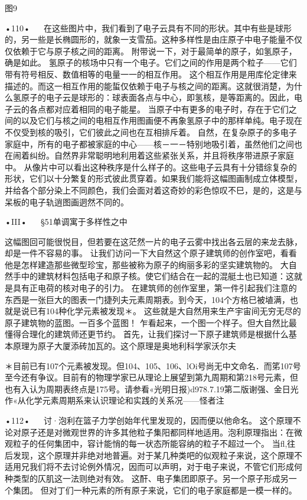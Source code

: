  

图9

•110•
  
在这些图片中，我们看到了电子云具有不同的形状。其中有些是球形的，另一些是长椭圆形的，就象一支雪茄。这种多样性是由庄原子中电子能量不仅仅依赖于它与原子核之间的距离。
附带说一下，对于最简单的原子，如氢原子，确是如此。
氢原子的核场中只有一个电子。它们之间的作用是两个粒子——它们带有符号相反、数值相等的电量一一的相互作用。
这个相互作用是用库伦定律来描述的。而这一相互作用的能蜇仅依赖于电子与核之间的距离。这就很消楚，为什么氢原子的电子云是球形的：球表面各点与中心，即氢核，是等距离的。因此，电子云的各点都对应着相同的电子能星。
当原子中有更多的电子时，存在于它们之间的以及它们与核之间的电相互作用图画便不再象氢原子中的那样单纯。电子现在不仅受到核的吸引，它们彼此之间也在互相排斥着。
自然，在复杂原子的多电子家庭中，所有的电子都被家庭的中心——核－一－特别地吸引着，虽然他们之间也在闹着纠纷。自然界非常聪明地利用着这些紧张关系，并且将秩序带进原子家庭中。
从像片中可以看出这种秩序是什么样子的。这些电子云具有十分错综复杂的形状，它们以十分繁复的形式彼此贯穿着。如果我们能将这幅图画制成立体模型，并给各个部分染上不同颜色，我们会面对着这奇妙的彩色惊叹不巳，是的，这是与呆板的电子轨逍图画迵然不同的。

•III•
  
§51单调寓于多样性之中

这幅图回可能很悦目，但若要在这茫然一片的电子云雾中找出各云层的来龙去脉，却是一件不容易的事。
让我们访问一下大自然这个原子建筑师的创作室吧，看看他是怎样建造那些微型珍宝，那些被称为原子的绚丽多彩的坚实建筑物的。
大自然手中的建筑材料包括电子和原子核。使它们结合在一起的混艇土也已知道：这就是具有正电荷的核对电子的引力。
在建筑师的创作室里，第一件引起我们注意的东西是一张巨大的图表一门捷列夫元素周期表。到今天，104个方格巳被埴满，也就是说已有104种化学元素被发现＊。
这些就是大自然用来生产宇宙间无穷无尽的原子建筑物的蓝图。一百多个蓝图！
乍看起来，一个图一个样子。但大自然比最懂得合理化的建筑师还更节约。
首先，让我们探讨一下原子建筑师是根据什么基本原理为原子大厦添砖加瓦的。这个原理是奥地利科学家沃尔夫

＊目前已有107个元素被发现。但104、105、106、lOi号尚无中文命名．而笫107号至今还有争议。目前有的物理学家已从理论上展望到第九周期和第218号元素，但也有入认为周期表终点是175号。请参看«光明日报)d978.7.19第二版谢强、金日光作«从化学元素周期系来认识理论和实践的关系况——怪者注

•112•
  
讨·泡利在篮子力学创始年代里发现的，因而便以他命名。
这个原理不论对原子还是对微观世界的许多其他粒子集阳都同样地适用。泡利原理指出：在微观粒子的任何集团中，容计能悄的每一状态所能容纳的粒子不超过一个。
当fl,往后发现，这个原理并非绝对地普遍。对于某几种类吧的似观粒子来说，这个原理不适用兄我们将不去讨论例外情况，因而可以声明，对于电子来说，不管它们形成何种类型的仄肌这一法则绝对有效。
这酐、电子集团即原子。另一个原子形成另一个集团。
但对丁们一种元素的所有原子来说，它们的电子家庭都是一模一样的。

